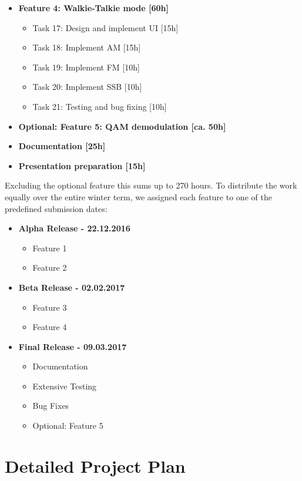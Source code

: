 \begin{itemize}
\begin{itemize}
\end{itemize}
\item \textbf{Feature 4: Walkie-Talkie mode [60h]}
\begin{itemize}
\item Task 17: Design and implement UI [15h]
\item Task 18: Implement AM [15h]
\item Task 19: Implement FM [10h]
\item Task 20: Implement SSB [10h]
\item Task 21: Testing and bug fixing [10h]
\end{itemize}
\item \textbf{Optional: Feature 5: \ac{QAM} demodulation [ca. 50h]}
\item \textbf{Documentation [25h]}
\item \textbf{Presentation preparation [15h]}

\end{itemize}

Excluding the optional feature this sums up to 270 hours. To distribute the work equally over the entire winter term, we assigned each feature to one of the predefined submission dates:

\begin{itemize}
	\item \textbf{Alpha Release - 22.12.2016}
		\begin{itemize}
		\item Feature 1
		\item Feature 2
		\end{itemize}
	\item \textbf{Beta Release - 02.02.2017}
		\begin{itemize}
			\item Feature 3
			\item Feature 4
		\end{itemize}
	\item \textbf{Final Release - 09.03.2017}
		\begin{itemize}
			\item Documentation
			\item Extensive Testing
			\item Bug Fixes
			\item Optional: Feature 5
		\end{itemize}
		
\end{itemize}

\section{Detailed Project Plan}

